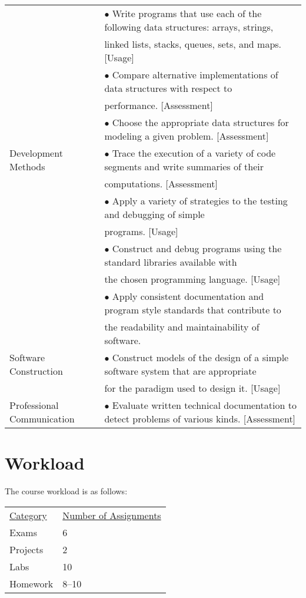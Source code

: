 \documentclass[10pt]{article}
\begin{document}
\begin{longtable}{|p{1.5in}|p{5.25in}|}
 & \(\bullet\) Write programs that use each of the following data structures: arrays, strings,\\
 & linked lists, stacks, queues, sets, and maps. [Usage]\\
 & \(\bullet\) Compare alternative implementations of data structures with respect to\\
 & performance. [Assessment]\\
 & \(\bullet\) Choose the appropriate data structures for modeling a given problem. [Assessment]\\
\hline
Development Methods & \(\bullet\) Trace the execution of a variety of code segments and write summaries of their\\
 & computations. [Assessment]\\
 & \(\bullet\) Apply a variety of strategies to the testing and debugging of simple\\
 & programs. [Usage]\\
 & \(\bullet\) Construct and debug programs using the standard libraries available with\\
 & the chosen programming language. [Usage]\\
 & \(\bullet\) Apply consistent documentation and program style standards that contribute to\\
 & the readability and maintainability of software.\\
\hline
Software Construction & \(\bullet\) Construct models of the design of a simple software system that are appropriate\\
 & for the paradigm used to design it. [Usage]\\
\hline
Professional Communication & \(\bullet\) Evaluate written technical documentation to detect problems of various kinds. [Assessment]\\
\hline
\end{longtable}
\normalsize

\section{Workload}

The course workload is as follows:
\begin{center}
  \begin{tabular}{ll}
    \underline{Category} & \underline{Number of Assignments} \\
    Exams & 6 \\
    Projects & 2 \\
    Labs & 10 \\
    Homework & 8--10
  \end{tabular}
\end{center}
\end{document}
